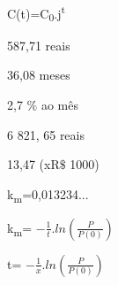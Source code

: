 \begin{respostas}{8.1}
    \ansitem{} C(t)=C\textsubscript{0}.j\textsuperscript{t}

    \ansitem{} 587,71 reais

    \ansitem{} 36,08 meses

    \ansitem{} 2,7 $\%$  ao mês 

    \ansitem{} 6 821, 65 reais
\end{respostas}

\begin{respostas}{8.2}
    \ansitem{} 13,47 (xR$\$$ 1000)

    \setcounter{enumi}{2}

    \ansitem{} k\textsubscript{m}=0,013234...
\end{respostas}

\begin{respostas}{8.3}
    \ansitem{} k\textsubscript{m}=  \( -\frac{1}{t} . ln \left( \frac{P}{P \left( 0 \right) } \right)  \)  

    \ansitem{} t=  \( -\frac{1}{x} .ln \left( \frac{P}{P \left( 0 \right) } \right)  \) 

\end{respostas}
